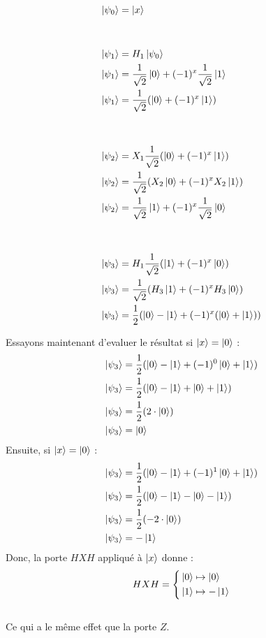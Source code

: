 \documentclass{article}
\begin{document}
    \begin{align*}
        \ket{\psi_0} &= \ket{x} \\ \\ \\
        \ket{\psi_1} &= H_1\ket{\psi_0} \\
        \ket{\psi_1} &= \frac{1}{\sqrt{2}}\ket{0} + (-1)^x \frac{1}{\sqrt{2}}\ket{1} \\
        \ket{\psi_1} &= \frac{1}{\sqrt{2}}(\ket{0} + (-1)^x \ket{1}) \\ \\ \\
        \ket{\psi_2} &= X_1\frac{1}{\sqrt{2}}(\ket{0} + (-1)^x\ket{1}) \\
        \ket{\psi_2} &= \frac{1}{\sqrt{2}}(X_2\ket{0} + (-1)^xX_2\ket{1}) \\
        \ket{\psi_2} &= \frac{1}{\sqrt{2}}\ket{1} + (-1)^x\frac{1}{\sqrt{2}}\ket{0} \\ \\ \\
        \ket{\psi_3} &= H_1\frac{1}{\sqrt{2}}(\ket{1} + (-1)^x\ket{0}) \\
        \ket{\psi_3} &= \frac{1}{\sqrt{2}}(H_3\ket{1} + (-1)^xH_3\ket{0}) \\
        \ket{\psi_3} &= \frac{1}{2}(\ket{0} - \ket{1} + (-1)^x (\ket{0} + \ket{1})) \\
    \end{align*}

Essayons maintenant d'evaluer le résultat si $\ket{x} = \ket{0}$ :\\
    \begin{align*}
        \ket{\psi_3} &= \frac{1}{2}(\ket{0} - \ket{1} + (-1)^0 \ket{0} + \ket{1}) \\
        \ket{\psi_3} &= \frac{1}{2}(\ket{0} - \ket{1} + \ket{0} + \ket{1}) \\
        \ket{\psi_3} &= \frac{1}{2}(2\cdot\ket{0}) \\
        \ket{\psi_3} &= \ket{0} \\
    \end{align*}
Ensuite, si $\ket{x} = \ket{0}$ : \\
    \begin{align*}
        \ket{\psi_3} &= \frac{1}{2}(\ket{0} - \ket{1} + (-1)^1 \ket{0} + \ket{1}) \\
        \ket{\psi_3} &= \frac{1}{2}(\ket{0} - \ket{1} - \ket{0} - \ket{1}) \\
        \ket{\psi_3} &= \frac{1}{2}(-2\cdot\ket{0}) \\
        \ket{\psi_3} &= -\ket{1} \\
    \end{align*}
Donc, la porte $HXH$ appliqué à $\ket{x}$ donne :
\[
HXH = 
    \left\{
        \begin{aligned}
            &\ket{0} \mapsto \ket{0}\\
            &\ket{1} \mapsto -\ket{1}
        \end{aligned}
    \right .
\] \\

Ce qui a le même effet que la porte $Z$.
\end{document}
